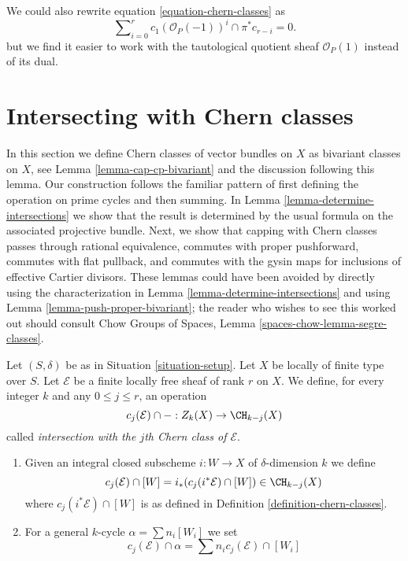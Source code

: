 \begin{remark}
\label{remark-equation-signs}
We could also rewrite equation \ref{equation-chern-classes} as
\begin{equation}
\label{equation-signs}
\sum\nolimits_{i = 0}^r
c_1(\mathcal{O}_P(-1))^i \cap \pi^*c_{r - i}
= 0.
\end{equation}
but we find it easier to work with the tautological quotient
sheaf $\mathcal{O}_P(1)$ instead of
its dual.
\end{remark}




\section{Intersecting with Chern classes}
\label{section-intersecting-chern-classes}

\noindent
In this section we define Chern classes of vector bundles on $X$ as
bivariant classes on $X$, see Lemma \ref{lemma-cap-cp-bivariant}
and the discussion following this lemma. Our construction follows the familiar
pattern of first defining the operation on prime cycles and then
summing. In Lemma \ref{lemma-determine-intersections} we show
that the result is determined by the usual formula on the associated
projective bundle. Next, we show that capping with Chern classes
passes through rational equivalence, commutes with proper pushforward,
commutes with flat pullback, and commutes with the gysin maps for
inclusions of effective Cartier divisors. These lemmas could have been
avoided by directly using the characterization in
Lemma \ref{lemma-determine-intersections} and using
Lemma \ref{lemma-push-proper-bivariant}; the reader who wishes to
see this worked out should consult
Chow Groups of Spaces, Lemma \ref{spaces-chow-lemma-segre-classes}.

\begin{definition}
\label{definition-cap-chern-classes}
Let $(S, \delta)$ be as in Situation \ref{situation-setup}.
Let $X$ be locally of finite type over $S$.
Let $\mathcal{E}$ be a finite locally free sheaf of rank $r$ on $X$.
We define, for every integer $k$ and any $0 \leq j \leq r$,
an operation
$$
c_j(\mathcal{E}) \cap - : Z_k(X) \to \CH_{k - j}(X)
$$
called {\it intersection with the $j$th Chern class of $\mathcal{E}$}.
\begin{enumerate}
\item Given an integral closed subscheme $i : W \to X$ of $\delta$-dimension
$k$ we define
$$
c_j(\mathcal{E}) \cap [W] = i_*(c_j({i^*\mathcal{E}}) \cap [W])
\in
\CH_{k - j}(X)
$$
where $c_j({i^*\mathcal{E}}) \cap [W]$ is as defined in
Definition \ref{definition-chern-classes}.
\item For a general $k$-cycle $\alpha = \sum n_i [W_i]$ we set
$$
c_j(\mathcal{E}) \cap \alpha = \sum n_i c_j(\mathcal{E}) \cap [W_i]
$$
\end{enumerate}
\end{definition}

